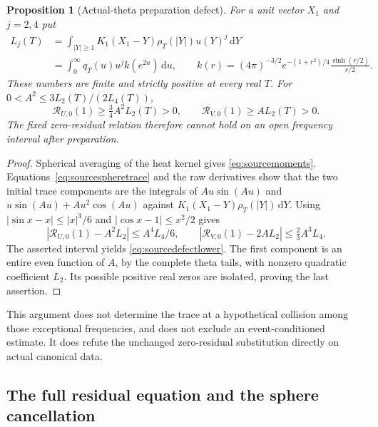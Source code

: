 \documentclass[11pt]{article}
\numberwithin{equation}{section}
\newtheorem{proposition}[theorem]{Proposition}
\newcommand{\dd}{\,\mathrm d}
\begin{document}
\begin{proposition}[Actual-theta preparation defect]
\label{prop:sourcepreparationdefect}
For a unit vector $X_1$ and $j=2,4$ put
\begin{align}
 L_j(T)&=\int_{|Y|\ge1}K_1(X_1-Y)\rho_T(|Y|)u(Y)^j\dd Y\nonumber\\
 &=\int_0^\infty q_T(u)u^j k(e^{2u})\dd u,
 \qquad
 k(r)=(4\pi)^{-3/2}e^{-(1+r^2)/4}\frac{\sinh(r/2)}{r/2}.
 \label{eq:sourcemoments}
\end{align}
These numbers are finite and strictly positive at every real $T$.
For
$0<A^2\le3L_2(T)/(2L_4(T))$,
\begin{equation}\label{eq:sourcedefectlower}
 \mathcal R_{U,0}(1)\ge\tfrac34A^2L_2(T)>0,
 \qquad \mathcal R_{V,0}(1)\ge A L_2(T)>0.
\end{equation}
The fixed zero-residual relation therefore cannot hold on an open
frequency interval after preparation.
\end{proposition}

\begin{proof}
Spherical averaging of the heat kernel gives
\eqref{eq:sourcemoments}. Equations~\eqref{eq:sourcespheretrace} and
the raw derivatives show that the two initial trace components are
the integrals of $A u\sin(Au)$ and
$u\sin(Au)+Au^2\cos(Au)$ against $K_1(X_1-Y)\rho_T(|Y|)\dd Y$.
Using $|\sin x-x|\le|x|^3/6$ and
$|\cos x-1|\le x^2/2$ gives
\begin{equation}\label{eq:sourcedefecterror}
 |\mathcal R_{U,0}(1)-A^2L_2|\le A^4L_4/6,\qquad
 |\mathcal R_{V,0}(1)-2AL_2|\le\tfrac23A^3L_4.
\end{equation}
The asserted interval yields \eqref{eq:sourcedefectlower}.
The first component is an entire even function of $A$, by the
complete theta tails, with nonzero quadratic coefficient $L_2$.
Its possible positive real zeros are isolated, proving the last
assertion.
\end{proof}

This argument does not determine the trace at a hypothetical collision
among those exceptional frequencies, and does not exclude an
event-conditioned estimate. It does refute the unchanged zero-residual
substitution directly on actual canonical data.

\subsection{The full residual equation and the sphere cancellation}
\end{document}

